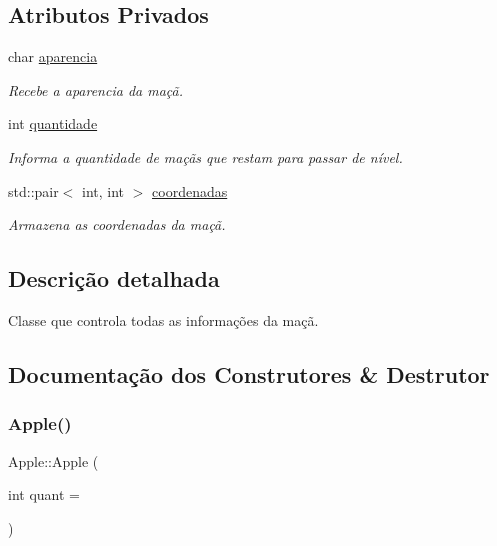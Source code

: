 \subsection*{Atributos Privados}
\begin{DoxyCompactItemize}
\item 
char \hyperlink{classApple_a30d63d92d655b11cf81309e4b4610465}{aparencia}
\begin{DoxyCompactList}\small\item\em Recebe a aparencia da maçã. \end{DoxyCompactList}\item 
int \hyperlink{classApple_a6f605e3860374c5e0ec55123ee4d4200}{quantidade}
\begin{DoxyCompactList}\small\item\em Informa a quantidade de maçãs que restam para passar de nível. \end{DoxyCompactList}\item 
std\+::pair$<$ int, int $>$ \hyperlink{classApple_ab2efb22edd843a549b29d5ba7ee40cc0}{coordenadas}
\begin{DoxyCompactList}\small\item\em Armazena as coordenadas da maçã. \end{DoxyCompactList}\end{DoxyCompactItemize}


\subsection{Descrição detalhada}
Classe que controla todas as informações da maçã. 

\subsection{Documentação dos Construtores \& Destrutor}
\mbox{\label{classApple_a60951a54bc0a4d118798dc2be43f4e5e}} 
\subsubsection{\texorpdfstring{Apple()}{Apple()}}
{\footnotesize\ttfamily Apple\+::\+Apple (\begin{DoxyParamCaption}\item[{int}]{quant = {} }\end{DoxyParamCaption})\hspace{0.3cm}{\ttfamily [inline]}}



